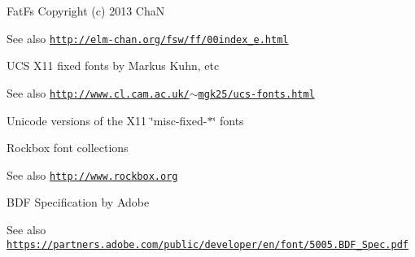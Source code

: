 \begin{DoxyParagraph}{Fat\+Fs Copyright (c) 2013 ChaN}

\end{DoxyParagraph}
\begin{DoxySeeAlso}{See also}
\href{http://elm-chan.org/fsw/ff/00index_e.html}{\tt http\+://elm-\/chan.\+org/fsw/ff/00index\+\_\+e.\+html} 

 
\end{DoxySeeAlso}
\begin{DoxyParagraph}{U\+CS X11 fixed fonts by Markus Kuhn, etc}

\end{DoxyParagraph}
\begin{DoxySeeAlso}{See also}
\href{http://www.cl.cam.ac.uk/~mgk25/ucs-fonts.html}{\tt http\+://www.\+cl.\+cam.\+ac.\+uk/$\sim$mgk25/ucs-\/fonts.\+html}
\begin{DoxyItemize}
\item Unicode versions of the X11 \char`\"{}misc-\/fixed-\/$\ast$\char`\"{} fonts 

 
\end{DoxyItemize}
\end{DoxySeeAlso}
\begin{DoxyParagraph}{Rockbox font collections}

\end{DoxyParagraph}
\begin{DoxySeeAlso}{See also}
\href{http://www.rockbox.org}{\tt http\+://www.\+rockbox.\+org} 

 
\end{DoxySeeAlso}
\begin{DoxyParagraph}{B\+DF Specification by Adobe}

\end{DoxyParagraph}
\begin{DoxySeeAlso}{See also}
\href{https://partners.adobe.com/public/developer/en/font/5005.BDF_Spec.pdf}{\tt https\+://partners.\+adobe.\+com/public/developer/en/font/5005.\+B\+D\+F\+\_\+\+Spec.\+pdf} 
\end{DoxySeeAlso}
